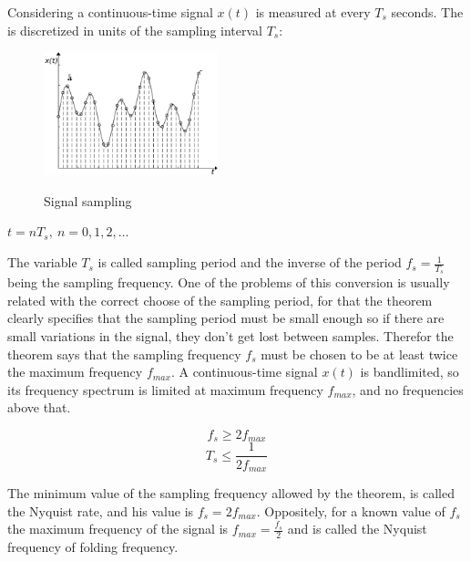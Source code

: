 Considering a continuous-time signal $x(t)$ is measured at every $T_{s}$ seconds. The is discretized in units of the sampling interval $T_{s}$:
\begin{figure}[!htb]
    \centering
    \includegraphics[width=0.45\textwidth]{Chapters/2CHP/Diagrams/sampsignal.eps}
    \caption{Signal sampling}{}
    \label{fig:signalsamp}
\end{figure}
\begin{center}
    $t = nT_s,\> n = 0, 1, 2, ...$
\end{center}
The variable $T_s$ is called sampling period and the inverse of the period $f_s=\frac{1}{T_s}$ being the sampling frequency. One of the problems of this conversion is usually related with the correct choose of the sampling period, for that the theorem clearly specifies that the sampling period must be small enough so if there are small variations in the signal, they don't get lost between samples. Therefor the theorem says that the sampling frequency $f_s$ must be chosen to be  at least twice the maximum frequency $f_{max}$. A continuous-time signal $x(t)$ is bandlimited, so its frequency spectrum is limited at maximum frequency $f_{max}$, and no frequencies above that.

\begin{equation} \label{eq:sampFreq}
       f_s \geq 2f_{max}
\end{equation}
\begin{equation} \label{eq:sampPeriod}
    T_s \leq \frac{1}{2f_{max}}
\end{equation}

The minimum value of the sampling frequency allowed by the theorem, is called the Nyquist rate, and his value is $f_s = 2f_{max}$. Oppositely, for a known value of $f_s$ the maximum frequency of the signal is $f_{max}=\frac{f_s}{2}$ and is called the Nyquist frequency of folding frequency.

